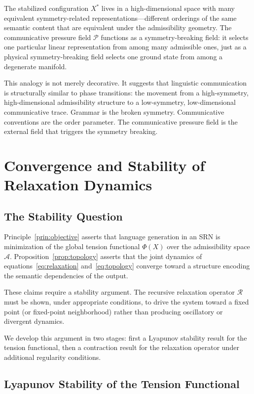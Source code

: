 \documentclass[11pt, a4paper]{article}
\theoremstyle{srn}
\theoremstyle{srnremark}
\newcommand{\Aspace}{\mathcal{A}}           %
\newcommand{\Rop}{\mathcal{R}}           %
\newcommand{\Phiten}{\varPhi}            %
\begin{document}
The stabilized configuration $X^*$ lives in a high-dimensional space
with many equivalent symmetry-related representations---different
orderings of the same semantic content that are equivalent under the
admissibility geometry.
The communicative pressure field $\mathcal{P}$ functions as a
symmetry-breaking field: it selects one particular linear
representation from among many admissible ones, just as a physical
symmetry-breaking field selects one ground state from among a
degenerate manifold.

This analogy is not merely decorative.
It suggests that linguistic communication is structurally similar to
phase transitions: the movement from a high-symmetry,
high-dimensional admissibility structure to a low-symmetry,
low-dimensional communicative trace.
Grammar is the broken symmetry.
Communicative conventions are the order parameter.
The communicative pressure field is the external field that triggers
the symmetry breaking.

\section{Convergence and Stability of Relaxation Dynamics}
\label{sec:convergence}

\subsection{The Stability Question}

Principle~\ref{prin:objective} asserts that language generation in an
SRN is minimization of the global tension functional $\Phiten(X)$ over
the admissibility space $\Aspace$.
Proposition~\ref{prop:topology} asserts that the joint dynamics of
equations~\eqref{eq:relaxation} and~\eqref{eq:topology} converge
toward a structure encoding the semantic dependencies of the output.

These claims require a stability argument.
The recursive relaxation operator $\Rop$ must be shown, under
appropriate conditions, to drive the system toward a fixed point
(or fixed-point neighborhood) rather than producing oscillatory or
divergent dynamics.

We develop this argument in two stages: first a Lyapunov stability
result for the tension functional, then a contraction result for the
relaxation operator under additional regularity conditions.

\subsection{Lyapunov Stability of the Tension Functional}
\end{document}
